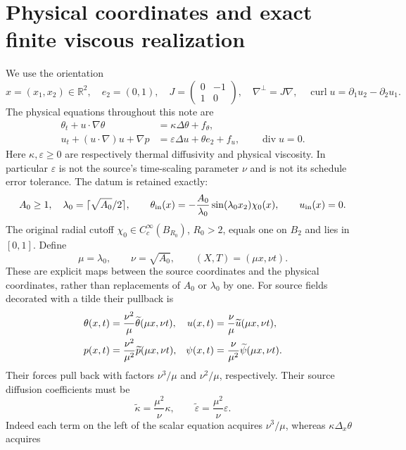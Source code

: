 \section{Physical coordinates and exact finite viscous realization}
\label{sec:physical}
We use the orientation
\[
 x=(x_1,x_2)\in\mathbb R^2,\quad e_2=(0,1),\quad
 J=\begin{pmatrix}0&-1\\1&0\end{pmatrix},\quad
 \nabla^\perp=J\nabla,\quad \operatorname{curl}u=\partial_1u_2-\partial_2u_1.
\]
The physical equations throughout this note are
\begin{align}
 \theta_t+u\cdot\nabla\theta&=\kappa\Delta\theta+f_\theta,
 \label{eq:physicaltheta}\\
 u_t+(u\cdot\nabla)u+\nabla p&=\varepsilon\Delta u+\theta e_2+f_u,
 \qquad \operatorname{div}u=0.\label{eq:physicalu}
\end{align}
Here $\kappa,\varepsilon\geq0$ are respectively thermal diffusivity and
physical viscosity. In particular $\varepsilon$ is not the source's
time-scaling parameter $\nu$ and is not its schedule error tolerance.
The datum is retained exactly:
\[
 A_0\geq1,\quad \lambda_0=\lceil\sqrt{A_0}/2\rceil,
 \qquad \theta_{\rm in}(x)=-\frac{A_0}{\lambda_0}
 \sin(\lambda_0x_2)\chi_0(x),\qquad u_{\rm in}(x)=0.
\]
The original radial cutoff $\chi_0\in C_c^\infty(B_{R_0})$, $R_0>2$,
equals one on $B_2$ and lies in $[0,1]$. Define
\[
 \mu=\lambda_0,\qquad \nu=\sqrt{A_0},\qquad (X,T)=(\mu x,\nu t).
\]
These are explicit maps between the source coordinates and the physical
coordinates, rather than replacements of $A_0$ or $\lambda_0$ by one.
For source fields decorated with a tilde their pullback is
\begin{align}
 \theta(x,t)&=\frac{\nu^2}{\mu}\widetilde\theta(\mu x,\nu t),&
 u(x,t)&=\frac\nu\mu\widetilde u(\mu x,\nu t),\notag\\
 p(x,t)&=\frac{\nu^2}{\mu^2}\widetilde p(\mu x,\nu t),&
 \psi(x,t)&=\frac\nu{\mu^2}\widetilde\psi(\mu x,\nu t).
 \label{eq:physicalmap}
\end{align}
Their forces pull back with factors $\nu^3/\mu$ and $\nu^2/\mu$,
respectively. Their source diffusion coefficients must be
\begin{equation}
 \widetilde\kappa=\frac{\mu^2}{\nu}\kappa,
 \qquad \widetilde\varepsilon=\frac{\mu^2}{\nu}\varepsilon.
 \label{eq:viscscale}
\end{equation}
Indeed each term on the left of the scalar equation acquires
$\nu^3/\mu$, whereas $\kappa\Delta_x\theta$ acquires
